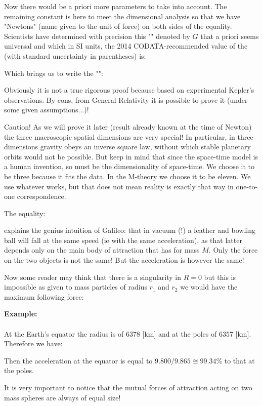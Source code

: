 	Now there would be a priori more parameters to take into account. The remaining constant is here to meet the dimensional analysis so that we have "Newtons" (name given to the unit of force) on both sides of the equality. Scientists have determined with precision this "" denoted by $G$ that a priori seems universal and which in SI units, the 2014 CODATA-recommended value of the (with standard uncertainty in parentheses) is:
	
	Which brings us to write the "":
	
	Obviously it is not a true rigorous proof because based on experimental Kepler's observations. By cons, from General Relativity it is possible to prove it (under some given assumptions...)!
	
	\begin{tcolorbox}[colback=red!5,borderline={1mm}{2mm}{red!5},arc=0mm,boxrule=0pt]
	\bcbombe Caution! As we will prove it later (result already known at the time of Newton) the three macroscopic spatial dimensions are very special! In particular, in three dimensions gravity obeys an inverse square law, without which stable planetary orbits would not be possible. But keep in mind that since the space-time model is a human invention, so must be the dimensionality of space-time. We choose it to be three because it fits the data. In the M-theory we choose it to be eleven. We use whatever works, but that does not mean reality is exactly that way in one-to-one correspondence.
	\end{tcolorbox}
	
	\begin{tcolorbox}[title=Remark,colframe=black,arc=10pt]
	The equality:
	
	explains the genius intuition of Galileo: that in vacuum (!) a feather and bowling ball will fall at the same speed (ie with the same acceleration), as that latter depends only on the main body of attraction that has for mass $M$. Only the force on the two objects is not the same! But the acceleration is however the same!
	\end{tcolorbox}
	Now some reader may think that there is a singularity in $R=0$ but this is impossible as given to mass particles of radius $r_1$ and $r_2$ we would have the maximum following force:
	
	\begin{tcolorbox}[colframe=black,colback=white,sharp corners]
	\textbf{{\Large {}}Example:}\\\\
	At the Earth's equator the radius is of $6378$ [km] and at the poles of $6357$ [km]. Therefore we have:
	
	Then the acceleration at the equator is equal to $9.800/9.865\cong 99.34 \%$ to that at the poles.
	\end{tcolorbox}
	It is very important to notice that the mutual forces of attraction acting on two mass spheres are always of equal size!
	
